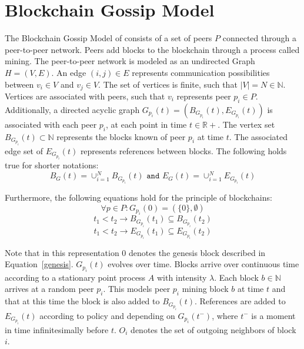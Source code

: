 \section{Blockchain Gossip Model}\label{gopalan}
The Blockchain Gossip Model of \citeauthor{gopalan} consists of a set of peers $P$ connected through a peer-to-peer network. Peers add blocks to the blockchain through a process called mining. 
The peer-to-peer network is modeled as an undirected Graph $H = (V,E)$.
An edge $(i,j) \in E$ represents communication possibilities between $v_i \in V$ and $v_j \in V$. 
The set of vertices is finite, such that $|V|=N \in \mathbb{N}$.
Vertices are associated with peers, such that $v_i$ represents peer $p_i \in P$.
Additionally, a directed acyclic graph $G_{p_i}(t) = (B_{G_{p_i}}(t),E_{G_{p_i}}(t))$ is associated with each peer $p_i$, at each point in time $t \in \mathbb{R+}$.
The vertex set $B_{G_{p_i}}(t) \subset \mathbb{N}$ represents the blocks known of peer $p_i$ at time $t$. The associated edge set of $E_{G_{p_i}}(t)$ represents references between blocks.
The following holds true for shorter notations:
\begin{equation}
B_G(t) = \cup_{i=1}^N B_{G_{p_i}}(t) \texttt{ and } E_G(t) = \cup_{i=1}^N E_{G_{p_i}}(t)
\label{unisondef}
\end{equation}

Furthermore, the following equations hold for the principle of blockchains:
\begin{equation}
\forall p \in P: G_{p_i}(0) = (\{0\},\emptyset)
\label{genesis}
\end{equation}
\begin{equation}
t_1 < t_2 \rightarrow B_{G_{p_i}}(t_1) \subseteq B_{G_{p_i}}(t_2)
\label{nodegrow}
\end{equation}
\begin{equation}
t_1 < t_2 \rightarrow E_{G_{p_i}}(t_1) \subseteq E_{G_{p_i}}(t_2)
\label{edgegrow}
\end{equation}

Note that in this representation $0$ denotes the genesis block described in Equation~\ref{genesis}.
$G_{p_i}(t)$ evolves over time. Blocks arrive over continuous time according to a stationary point process $A$ with intensity $\lambda$. Each block $b \in \mathbb{N}$ arrives at a random peer $p_i$.
This models peer $p_i$ mining block $b$ at time $t$ and that at this time the block is also added to $B_{G_{p_i}}(t)$.
References are added to $E_{G_{p_i}}(t)$ according to policy and depending on $G_{p_i}(t^-)$, where $t^-$ is a moment in time infinitesimally before $t$. $O_i$ denotes the set of outgoing neighbors of block $i$.

